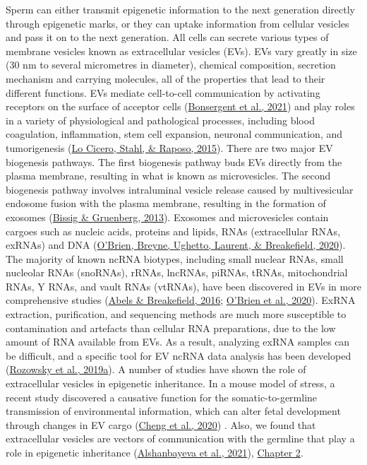 \documentclass[12pt,twoside]{reedthesis}
\begin{document}
Sperm can either transmit epigenetic information to the next generation
directly through epigenetic marks, or they can uptake information from
cellular vesicles and pass it on to the next generation. All cells can
secrete various types of membrane vesicles known as extracellular
vesicles (EVs). EVs vary greatly in size (30 nm to several micrometres
in diameter), chemical composition, secretion mechanism and carrying
molecules, all of the properties that lead to their different functions.
EVs mediate cell-to-cell communication by activating receptors on the
surface of acceptor cells (\protect\hyperlink{ref-bonsergent2021}{Bonsergent et al., 2021}) and play roles in a variety
of physiological and pathological processes, including blood
coagulation, inflammation, stem cell expansion, neuronal communication,
and tumorigenesis (\protect\hyperlink{ref-locicero2015}{Lo Cicero, Stahl, \& Raposo, 2015}). There are two major EV biogenesis
pathways. The first biogenesis pathway buds EVs directly from the plasma
membrane, resulting in what is known as microvesicles. The second
biogenesis pathway involves intraluminal vesicle release caused by
multivesicular endosome fusion with the plasma membrane, resulting in
the formation of exosomes (\protect\hyperlink{ref-bissig2013}{Bissig \& Gruenberg, 2013}). Exosomes and microvesicles
contain cargoes such as nucleic acids, proteins and lipids, RNAs
(extracellular RNAs, exRNAs) and DNA (\protect\hyperlink{ref-obrien2020}{O'Brien, Breyne, Ughetto, Laurent, \& Breakefield, 2020}). The majority of
known ncRNA biotypes, including small nuclear RNAs, small nucleolar RNAs
(snoRNAs), rRNAs, lncRNAs, piRNAs, tRNAs, mitochondrial RNAs, Y RNAs,
and vault RNAs (vtRNAs), have been discovered in EVs in more
comprehensive studies (\protect\hyperlink{ref-abels2016}{Abels \& Breakefield, 2016}; \protect\hyperlink{ref-obrien2020}{O'Brien et al., 2020}). ExRNA extraction,
purification, and sequencing methods are much more susceptible to
contamination and artefacts than cellular RNA preparations, due to the
low amount of RNA available from EVs. As a result, analyzing exRNA
samples can be difficult, and a specific tool for EV ncRNA data analysis
has been developed (\protect\hyperlink{ref-rozowsky2019}{Rozowsky et al., 2019a}). A number of studies have shown the
role of extracellular vesicles in epigenetic inheritance. In a mouse
model of stress, a recent study discovered a causative function for the
somatic-to-germline transmission of environmental information, which can
alter fetal development through changes in EV cargo (\protect\hyperlink{ref-cheng2020}{Cheng et al., 2020}) . Also,
we found that extracellular vesicles are vectors of communication with
the germline that play a role in epigenetic inheritance
(\protect\hyperlink{ref-alshanbayeva2021}{Alshanbayeva et al., 2021}), \protect\hyperlink{chapter2}{Chapter 2}.
\end{document}
